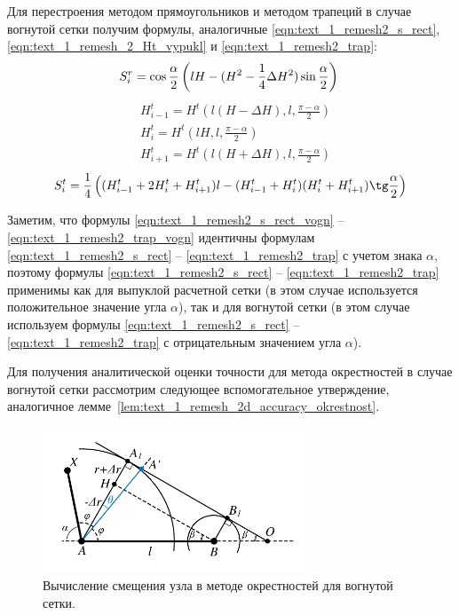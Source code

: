 Для перестроения методом прямоугольников и методом трапеций в случае вогнутой сетки получим формулы, аналогичные \eqref{eqn:text_1_remesh2_s_rect}, \eqref{eqn:text_1_remesh_2_Ht_vypukl} и \eqref{eqn:text_1_remesh2_trap}:
\begin{equation}\label{eqn:text_1_remesh2_s_rect_vogn}
	S_i^r = \cos \frac{\alpha}{2} \left( lH - ( H^2 - \frac{1}{4} \Delta H^2 ) \sin \frac{\alpha}{2} \right) \\
\end{equation}
\begin{equation}\label{eqn:text_1_remesh_2_Ht_vogn}
	\begin{aligned}
	& H_{i - 1}^t = H^t\left(l(H - \Delta H), l, \frac{\pi - \alpha}{2}\right) \\ 
	& H_i^t = H^t\left(lH, l, \frac{\pi - \alpha}{2}\right) \\
	& H_{i + 1}^t = H^t\left(l(H + \Delta H), l, \frac{\pi - \alpha}{2}\right)
	\end{aligned}
\end{equation}
\begin{equation}\label{eqn:text_1_remesh2_trap_vogn}
	S_i^t = \frac{1}{4} \left( (H_{i - 1}^t + 2 H_i^t + H_{i + 1}^t)l - (H_{i - 1}^t + H_i^t) (H_i^t + H_{i+1}^t) \tg \frac{\alpha}{2} \right)
\end{equation}

Заметим, что формулы \eqref{eqn:text_1_remesh2_s_rect_vogn} -- \eqref{eqn:text_1_remesh2_trap_vogn} идентичны формулам \eqref{eqn:text_1_remesh2_s_rect} -- \eqref{eqn:text_1_remesh2_trap} с учетом знака $\alpha$, поэтому формулы \eqref{eqn:text_1_remesh2_s_rect} -- \eqref{eqn:text_1_remesh2_trap} применимы как для выпуклой расчетной сетки (в этом случае используется положительное значение угла $\alpha$), так и для вогнутой сетки (в этом случае используем формулы \eqref{eqn:text_1_remesh2_s_rect} -- \eqref{eqn:text_1_remesh2_trap} с отрицательным значением угла $\alpha$).

Для получения аналитической оценки точности для метода окрестностей в случае вогнутой сетки рассмотрим следующее вспомогательное утверждение, аналогичное лемме~\ref{lem:text_1_remesh_2d_accuracy_okrestnost}.

\begin{figure}[ht]
\centering
\includegraphics[width=0.7\textwidth]{fig/2dr_accuracy_okrestnost2.pdf}
\singlespacing
{}\caption{Вычисление смещения узла в методе окрестностей для вогнутой сетки.}
\label{fig:text_1_remesh_2d_accuracy_okrestnost}
\end{figure}


